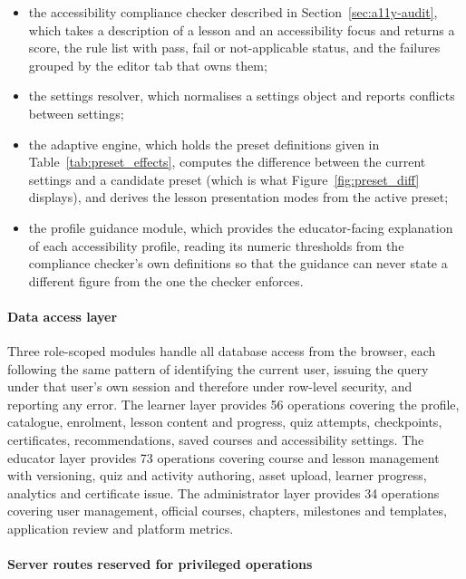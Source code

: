 \documentclass[12pt, oneside]{article} %
\begin{document}
\begin{itemize}
    \item the accessibility compliance checker described in Section~\ref{sec:a11y-audit}, which takes a description of a lesson and an accessibility focus and returns a score, the rule list with pass, fail or not-applicable status, and the failures grouped by the editor tab that owns them;
    \item the settings resolver, which normalises a settings object and reports conflicts between settings;
    \item the adaptive engine, which holds the preset definitions given in Table~\ref{tab:preset_effects}, computes the difference between the current settings and a candidate preset (which is what Figure~\ref{fig:preset_diff} displays), and derives the lesson presentation modes from the active preset;
    \item the profile guidance module, which provides the educator-facing explanation of each accessibility profile, reading its numeric thresholds from the compliance checker's own definitions so that the guidance can never state a different figure from the one the checker enforces.
\end{itemize}

\paragraph{Data access layer}

Three role-scoped modules handle all database access from the browser, each following the same pattern of identifying the current user, issuing the query under that user's own session and therefore under row-level security, and reporting any error. The learner layer provides 56 operations covering the profile, catalogue, enrolment, lesson content and progress, quiz attempts, checkpoints, certificates, recommendations, saved courses and accessibility settings. The educator layer provides 73 operations covering course and lesson management with versioning, quiz and activity authoring, asset upload, learner progress, analytics and certificate issue. The administrator layer provides 34 operations covering user management, official courses, chapters, milestones and templates, application review and platform metrics.

\paragraph{Server routes reserved for privileged operations}
\end{document}
